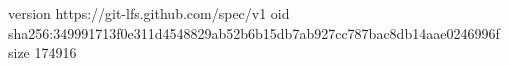 version https://git-lfs.github.com/spec/v1
oid sha256:349991713f0e311d4548829ab52b6b15db7ab927cc787bac8db14aae0246996f
size 174916
